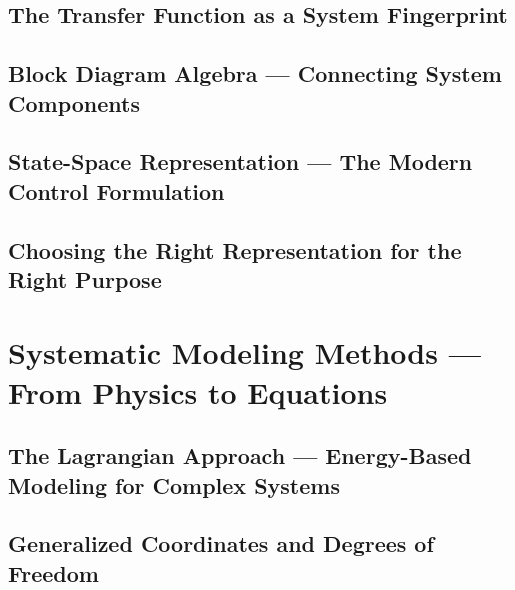 \documentclass[11pt,letterpaper]{article}
\begin{document}


\subsection{The Transfer Function as a System Fingerprint}
\label{sec:tf_fingerprint}



\subsection{Block Diagram Algebra --- Connecting System Components}
\label{sec:block_diagram_algebra}



\subsection{State-Space Representation --- The Modern Control Formulation}
\label{sec:state_space}



\subsection{Choosing the Right Representation for the Right Purpose}
\label{sec:choosing_representation}



\section{Systematic Modeling Methods --- From Physics to Equations}
\label{sec:systematic_modeling}

\subsection{The Lagrangian Approach --- Energy-Based Modeling for Complex Systems}
\label{sec:lagrangian}



\subsection{Generalized Coordinates and Degrees of Freedom}
\label{sec:generalized_coordinates}
\end{document}
